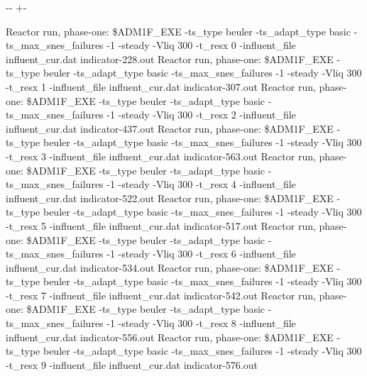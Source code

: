 \documentclass[a4paper,10pt,english]{sphinxmanual}
\newlength\nbsphinxcodecellspacing
\begin{document}
{

\kern-\sphinxverbatimsmallskipamount\kern-\baselineskip
\kern+\FrameHeightAdjust\kern-\fboxrule
\vspace{\nbsphinxcodecellspacing}

\begin{sphinxVerbatim}[commandchars=\\\{\}]
Reactor run, phase-one:
\$ADM1F\_EXE -ts\_type beuler -ts\_adapt\_type basic -ts\_max\_snes\_failures -1 -steady -Vliq 300 -t\_resx 0 -influent\_file influent\_cur.dat
indicator-228.out
Reactor run, phase-one:
\$ADM1F\_EXE -ts\_type beuler -ts\_adapt\_type basic -ts\_max\_snes\_failures -1 -steady -Vliq 300 -t\_resx 1 -influent\_file influent\_cur.dat
indicator-307.out
Reactor run, phase-one:
\$ADM1F\_EXE -ts\_type beuler -ts\_adapt\_type basic -ts\_max\_snes\_failures -1 -steady -Vliq 300 -t\_resx 2 -influent\_file influent\_cur.dat
indicator-437.out
Reactor run, phase-one:
\$ADM1F\_EXE -ts\_type beuler -ts\_adapt\_type basic -ts\_max\_snes\_failures -1 -steady -Vliq 300 -t\_resx 3 -influent\_file influent\_cur.dat
indicator-563.out
Reactor run, phase-one:
\$ADM1F\_EXE -ts\_type beuler -ts\_adapt\_type basic -ts\_max\_snes\_failures -1 -steady -Vliq 300 -t\_resx 4 -influent\_file influent\_cur.dat
indicator-522.out
Reactor run, phase-one:
\$ADM1F\_EXE -ts\_type beuler -ts\_adapt\_type basic -ts\_max\_snes\_failures -1 -steady -Vliq 300 -t\_resx 5 -influent\_file influent\_cur.dat
indicator-517.out
Reactor run, phase-one:
\$ADM1F\_EXE -ts\_type beuler -ts\_adapt\_type basic -ts\_max\_snes\_failures -1 -steady -Vliq 300 -t\_resx 6 -influent\_file influent\_cur.dat
indicator-534.out
Reactor run, phase-one:
\$ADM1F\_EXE -ts\_type beuler -ts\_adapt\_type basic -ts\_max\_snes\_failures -1 -steady -Vliq 300 -t\_resx 7 -influent\_file influent\_cur.dat
indicator-542.out
Reactor run, phase-one:
\$ADM1F\_EXE -ts\_type beuler -ts\_adapt\_type basic -ts\_max\_snes\_failures -1 -steady -Vliq 300 -t\_resx 8 -influent\_file influent\_cur.dat
indicator-556.out
Reactor run, phase-one:
\$ADM1F\_EXE -ts\_type beuler -ts\_adapt\_type basic -ts\_max\_snes\_failures -1 -steady -Vliq 300 -t\_resx 9 -influent\_file influent\_cur.dat
indicator-576.out
\end{sphinxVerbatim}
}
\end{document}

